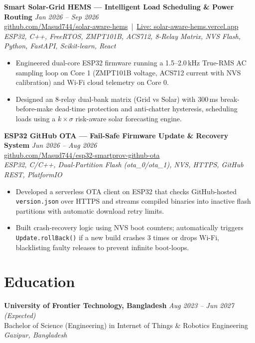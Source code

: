 \documentclass[10pt,a4paper]{article}
\begin{document}
\textbf{Smart Solar-Grid HEMS --- Intelligent Load Scheduling \& Power Routing} \hfill \textit{Jan 2026 -- Sep 2026} \\
\href{https://github.com/Masud744/solar-aware-hems}{github.com/Masud744/solar-aware-hems} \,|\, \href{https://solar-aware-hems.vercel.app}{Live: solar-aware-hems.vercel.app} \\
\textit{ESP32, C++, FreeRTOS, ZMPT101B, ACS712, 8-Relay Matrix, NVS Flash, Python, FastAPI, Scikit-learn, React}
\begin{itemize}
    \item Engineered dual-core ESP32 firmware running a 1.5--2.0\,kHz True-RMS AC sampling loop on Core 1 (ZMPT101B voltage, ACS712 current with NVS calibration) and Wi-Fi cloud telemetry on Core 0.
    \item Designed an 8-relay dual-bank matrix (Grid vs Solar) with 300\,ms break-before-make dead-time protection and anti-chatter hysteresis, scheduling loads using a $k \times \sigma$ risk-aware solar forecasting engine.
\end{itemize}
\vspace{2.5pt}

\textbf{ESP32 GitHub OTA --- Fail-Safe Firmware Update \& Recovery System} \hfill \textit{Jun 2026 -- Aug 2026} \\
\href{https://github.com/Masud744/esp32-smartprov-github-ota}{github.com/Masud744/esp32-smartprov-github-ota} \\
\textit{ESP32, C/C++, Dual-Partition Flash (ota\_0/ota\_1), NVS, HTTPS, GitHub REST, PlatformIO}
\begin{itemize}
    \item Developed a serverless OTA client on ESP32 that checks GitHub-hosted \texttt{version.json} over HTTPS and streams compiled binaries into inactive flash partitions with automatic download retry limits.
    \item Built crash-recovery logic using NVS boot counters; automatically triggers \texttt{Update.rollBack()} if a new build crashes 3 times or drops Wi-Fi, blacklisting faulty releases to prevent infinite boot-loops.
\end{itemize}

\section*{Education}

\textbf{University of Frontier Technology, Bangladesh} \hfill \textit{Aug 2023 -- Jun 2027 (Expected)} \\
Bachelor of Science (Engineering) in Internet of Things \& Robotics Engineering \hfill \textit{Gazipur, Bangladesh}
\end{document}
